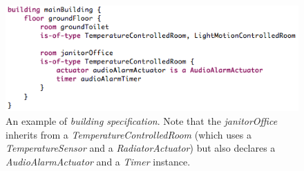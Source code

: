 \begin{figure}
  \centering
  \includegraphics[scale=.5]{dsl-building-definition.png}  
  \caption{An example of \textit{building specification}. Note that the \textit{janitorOffice} inherits from a \textit{TemperatureControlledRoom} (which uses a \textit{TemperatureSensor} and a \textit{RadiatorActuator}) but also declares a \textit{AudioAlarmActuator} and a \textit{Timer} instance.}
  \label{fig:dsl-building-definition}
\end{figure}

